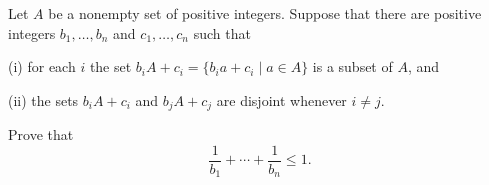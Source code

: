 Let $A$ be a nonempty set of positive integers. Suppose that there are positive integers $b_1, \ldots, b_n$ and $c_1, \ldots, c_n$ such that

(i) for each $i$ the set $b_i A + c_i = \{ b_i a + c_i \mid a \in A \}$ is a subset of $A$, and

(ii) the sets $b_i A + c_i$ and $b_j A + c_j$ are disjoint whenever $i \neq j$.

Prove that
\[ \frac{1}{b_1} + \cdots + \frac{1}{b_n} \leq 1. \]
